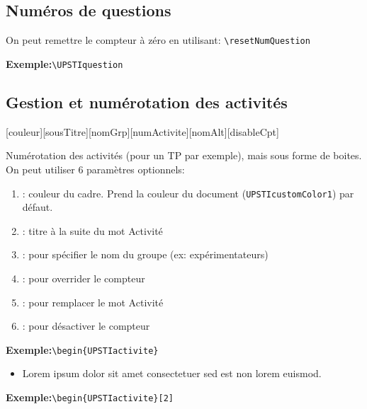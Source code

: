 \documentclass[11pt]{ltxdockit}[2010/09/26]
\newcommand{\Lorem}{Lorem ipsum dolor sit amet consectetuer sed est non lorem euismod.}
\newcommand{\ex}{\noindent \textbf{Exemple:}\quad}
\begin{document}
\subsection{Numéros de questions}
\begin{ltxsyntax}
\end{ltxsyntax}
On peut remettre le compteur à zéro en utilisant: \verb!\resetNumQuestion!

\ex\verb!\UPSTIquestion!

\vspace{1em}
\UPSTIquestion


\subsection{Gestion et numérotation des activités}
\begin{ltxsyntax}
[couleur][sousTitre][nomGrp][numActivite][nomAlt][disableCpt]
\end{ltxsyntax}

\noindent Numérotation des activités (pour un TP par exemple), mais sous forme de boites. On peut utiliser 6 paramètres optionnels:
\begin{enumerate}
\item {}: couleur du cadre. Prend la couleur du document (\texttt{UPSTIcustomColor1}) par défaut.
\item {}: titre à la suite du mot \og Activité\fg{}
\item {}: pour spécifier le nom du groupe (ex: expérimentateurs)
\item {}: pour overrider le compteur
\item {}: pour remplacer le mot \og Activité \fg{} 
\item {}: pour désactiver le compteur
\end{enumerate}

\vspace{1em}
\ex\verb!\begin{UPSTIactivite}!

\begin{UPSTIactivite}
\begin{itemize}
\item \Lorem
\end{itemize}
\end{UPSTIactivite} 

\vspace{1em}
\ex\verb!\begin{UPSTIactivite}[2]!
\end{document}
